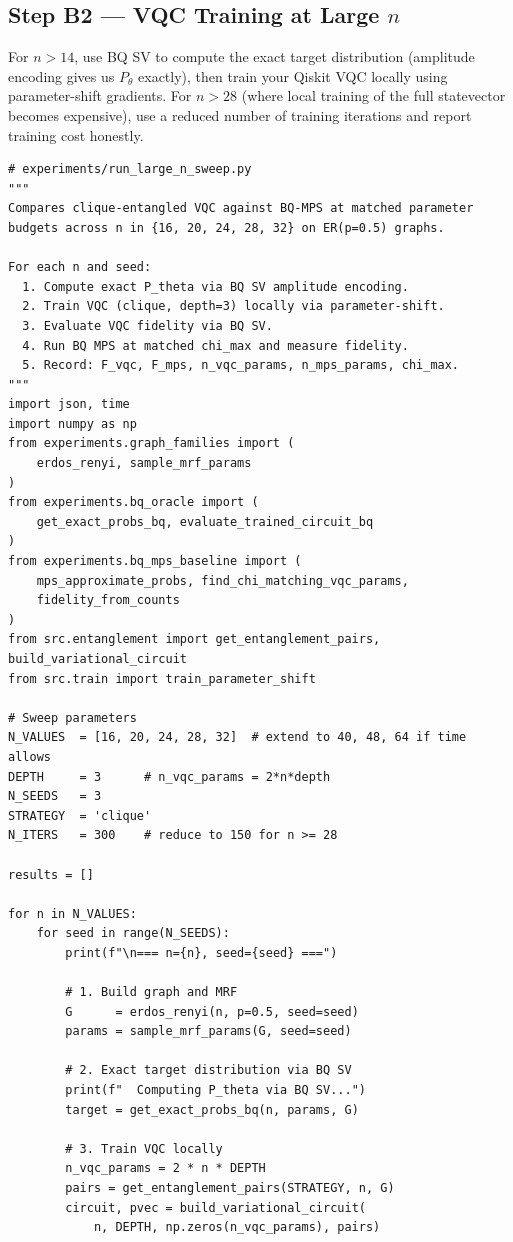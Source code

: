 \documentclass[11pt]{article}
\begin{document}
\subsection{Step B2 --- VQC Training at Large $n$}

For $n > 14$, use BQ SV to compute the exact target distribution
(amplitude encoding gives us $P_\theta$ exactly), then train
your Qiskit VQC locally using parameter-shift gradients.
For $n > 28$ (where local training of the full statevector becomes
expensive), use a reduced number of training iterations and
report training cost honestly.

\begin{lstlisting}
# experiments/run_large_n_sweep.py
"""
Compares clique-entangled VQC against BQ-MPS at matched parameter
budgets across n in {16, 20, 24, 28, 32} on ER(p=0.5) graphs.

For each n and seed:
  1. Compute exact P_theta via BQ SV amplitude encoding.
  2. Train VQC (clique, depth=3) locally via parameter-shift.
  3. Evaluate VQC fidelity via BQ SV.
  4. Run BQ MPS at matched chi_max and measure fidelity.
  5. Record: F_vqc, F_mps, n_vqc_params, n_mps_params, chi_max.
"""
import json, time
import numpy as np
from experiments.graph_families import (
    erdos_renyi, sample_mrf_params
)
from experiments.bq_oracle import (
    get_exact_probs_bq, evaluate_trained_circuit_bq
)
from experiments.bq_mps_baseline import (
    mps_approximate_probs, find_chi_matching_vqc_params,
    fidelity_from_counts
)
from src.entanglement import get_entanglement_pairs, build_variational_circuit
from src.train import train_parameter_shift

# Sweep parameters
N_VALUES  = [16, 20, 24, 28, 32]  # extend to 40, 48, 64 if time allows
DEPTH     = 3      # n_vqc_params = 2*n*depth
N_SEEDS   = 3
STRATEGY  = 'clique'
N_ITERS   = 300    # reduce to 150 for n >= 28

results = []

for n in N_VALUES:
    for seed in range(N_SEEDS):
        print(f"\n=== n={n}, seed={seed} ===")

        # 1. Build graph and MRF
        G      = erdos_renyi(n, p=0.5, seed=seed)
        params = sample_mrf_params(G, seed=seed)

        # 2. Exact target distribution via BQ SV
        print(f"  Computing P_theta via BQ SV...")
        target = get_exact_probs_bq(n, params, G)

        # 3. Train VQC locally
        n_vqc_params = 2 * n * DEPTH
        pairs = get_entanglement_pairs(STRATEGY, n, G)
        circuit, pvec = build_variational_circuit(
            n, DEPTH, np.zeros(n_vqc_params), pairs)


\end{lstlisting}
\end{document}
